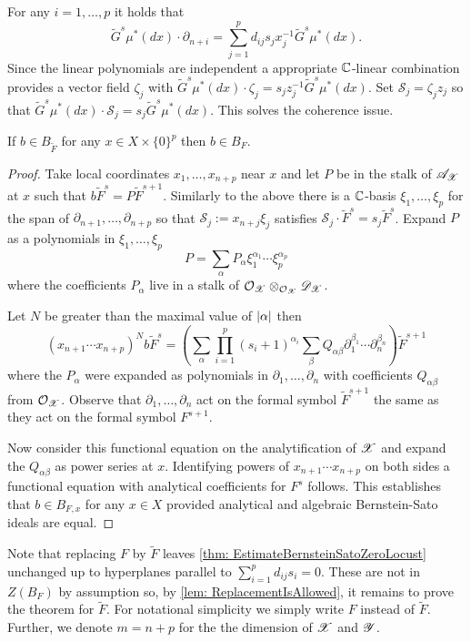 For any $i=1,\ldots,p$ it holds that
$$\widetilde{G}^s \mu^*(dx)\cdot \partial_{n+i} = \sum_{j=1}^p d_{ij}s_j x_j^{-1} \widetilde{G}^s \mu^*(dx).$$
Since the linear polynomials are independent a appropriate $\mathbb{C}$-linear combination provides a vector field $\zeta_j$ with $\widetilde{G}^s \mu^*(dx)\cdot \zeta_j = s_{j}z_j^{-1}\widetilde{G}^s \mu^*(dx)$.
Set $\mathcal{S}_j = \zeta_jz_j$ so that $\widetilde{G}^s \mu^*(dx) \cdot \mathcal{S}_j = s_j \widetilde{G}^s \mu^*(dx) $.
This solves the coherence issue.
\begin{lemma}\label{lem: ReplacementIsAllowed}
  If $b\in B_{\widetilde{F}}$ for any $x\in X\times \{0\}^p$ then $b \in B_F$.
\end{lemma}
\begin{proof}
  Take local coordinates $x_1,\ldots, x_{n+p}$ near $x$ and let $P$ be in the stalk of $\mathscr{A}_{\mathscr{X}}$ at $x$ such that $b \widetilde{F}^s = P \widetilde{F}^{s+1}$.
  Similarly to the above there is a $\mathbb{C}$-basis $\xi_1,\ldots,\xi_p$ for the span of $\partial_{n+1}, \ldots, \partial_{n+p}$ so that $\mathcal{S}_j := x_{n+j}\xi_j$ satisfies $\mathcal{S}_j \cdot \widetilde{F}^s = s_{j}\widetilde{F}^s$.
  Expand $P$ as a polynomials in $\xi_1,\ldots,\xi_p$
  $$P = \sum_{\alpha} P_\alpha \xi_{1}^{\alpha_1}\cdots \xi_{p}^{\alpha_p}$$
  where the coefficients $P_\alpha$ live in a stalk of $\mathcal{O}_{\mathscr{X}}\otimes_{\mathcal{O}_{\mathscr{X}}}\mathscr{D}_{\mathscr{X}}$.

  Let $N$ be greater than the maximal value of $\vert \alpha \vert$ then
  $$(x_{n+1}\cdots x_{n+p})^N b \widetilde{F}^s = \left(\sum_{\alpha} \prod_{i=1}^p (s_i + 1)^{\alpha_i} \sum_\beta Q_{\alpha\beta} \partial_1^{\beta_1}\cdots \partial_n^{\beta_n} \right)\widetilde{F}^{s+1}$$
  where the $P_\alpha$ were expanded as polynomials in $\partial_1,\ldots,\partial_n$ with coefficients $Q_{\alpha\beta}$ from $\mathcal{O}_{\mathscr{X}}$.
  Observe that $\partial_1,\ldots, \partial_n$ act on the formal symbol $\widetilde{F}^{s+1}$ the same as they act on the formal symbol $F^{s+1}$.

  Now consider this functional equation on the analytification of $\mathscr{X}$ and expand the $Q_{\alpha\beta}$ as power series at $x$.
  Identifying powers of $x_{n+1}\cdots x_{n+p}$ on both sides a functional equation with analytical coefficients for $F^s$ follows.
  This establishes that $b \in B_{F,x}$ for any $x\in X$ provided analytical and algebraic Bernstein-Sato ideals are equal.
\end{proof}
Note that replacing $F$ by $\widetilde{F}$ leaves \cref{thm: EstimateBernsteinSatoZeroLocust} unchanged up to hyperplanes parallel to $\sum_{i=1}^p d_{ij}s_i = 0$.
These are not in $Z(B_F)$ by assumption so, by \cref{lem: ReplacementIsAllowed}, it remains to prove the theorem for $\widetilde{F}$.
For notational simplicity we simply write $F$ instead of $\widetilde{F}$.
Further, we denote $m = n+p$ for the the dimension of $\mathscr{X}$ and $\mathscr{Y}$.

